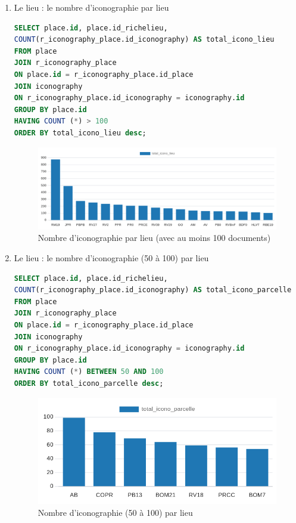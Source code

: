 \begin{enumerate}
\begin{enumerate}
\newpage

        \item Le lieu : le nombre d'iconographie par lieu 
            \begin{lstlisting}[language=SQL, caption=Nombre d'iconographies par lieu]
SELECT place.id, place.id_richelieu,  
COUNT(r_iconography_place.id_iconography) AS total_icono_lieu 
FROM place 
JOIN r_iconography_place 
ON place.id = r_iconography_place.id_place 
JOIN iconography  
ON r_iconography_place.id_iconography = iconography.id 
GROUP BY place.id 
HAVING COUNT (*) > 100
ORDER BY total_icono_lieu desc; \end{lstlisting}
\begin{figure}[ht!]
                \centering
                \includegraphics[width=1\linewidth]{images/graphiques/nb_icono_lieu_>100.png}
                \caption{Nombre d'iconographie par lieu (avec au moins 100 documents)}
                \label{fig:nb_icono_lieu>100}
            \end{figure}    

\newpage
\item Le lieu : le nombre d'iconographie (50 à 100) par lieu
            \begin{lstlisting}[language=SQL, caption=Nombre d'iconographies par lieu 50-100]
SELECT place.id, place.id_richelieu,  
COUNT(r_iconography_place.id_iconography) AS total_icono_parcelle 
FROM place 
JOIN r_iconography_place 
ON place.id = r_iconography_place.id_place 
JOIN iconography  
ON r_iconography_place.id_iconography = iconography.id 
GROUP BY place.id 
HAVING COUNT (*) BETWEEN 50 AND 100
ORDER BY total_icono_parcelle desc; \end{lstlisting}
\begin{figure}[ht!]
                \centering
                \includegraphics[width=1\linewidth]{images/graphiques/nb_icono_lieu_50-100.png}
                \caption{Nombre d'iconographie (50 à 100) par lieu}
                \label{fig:nb_icono_lieu_50-100}
            \end{figure}    


\end{enumerate}
\end{enumerate}
